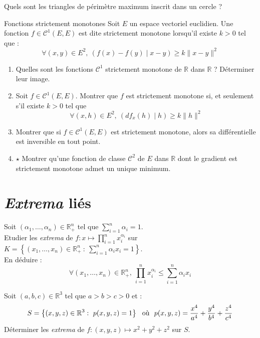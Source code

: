 \documentclass[french,a4paper]{article}
\newcommand{\R}{\mathbb{R}}
\theoremstyle{plain}
\theoremstyle{definition}
\theoremstyle{remark}
\begin{document}
\begin{ex}[Moulin.CD.42]{}
	Quels sont les triangles de périmètre maximum inscrit dans un cercle ?
\end{ex}

\begin{ex}[Moulin.CD.42]{Fonctions strictement monotones}
	Soit $E$ un espace vectoriel euclidien. Une fonction $f\in\mathcal{C}^1(E,E)$ est dite strictement monotone lorsqu'il existe $k>0$ tel que : $$\forall (x,y)\in E^2,\ \left(f(x)-f(y)\mid x-y\right)\geqslant k\lVert x-y\rVert^2$$
	\begin{enumerate}
		\item Quelles sont les fonctions $\mathcal{C}^1$ strictement monotone de $\R$ dans $\R$ ? Déterminer leur image.
		\item Soit $f\in\mathcal{C}^1(E,E)$. Montrer que $f$ est strictement monotone si, et seulement s'il existe $k>0$ tel que $$\forall (x,h)\in E^2,\ \left(df_x(h)\mid h\right)\geqslant k\lVert h\rVert^2$$
		\item Montrer que si $f\in\mathcal{C}^1(E,E)$ est strictement monotone, alors sa différentielle est inversible en tout point.
		\item $\star$ Montrer qu'une fonction de classe $\mathcal{C}^2$ de $E$ dans $\R$ dont le gradient est strictement monotone admet un unique minimum.
	\end{enumerate}
\end{ex}

\section{\textit{Extrema} liés}

\begin{ex}[Moulin.CD.44]{}
	Soit $(\alpha_1,\ldots,\alpha_n)\in\R_+^n$ tel que $\displaystyle\sum_{i=1}^{n}\alpha_i=1$. \\
	Etudier les \textit{extrema} de $f:x\mapsto\displaystyle\prod_{i=1}^{n}x_i^{\alpha_i}$ sur $K=\displaystyle\left\{(x_1,\ldots,x_n)\in\R_+^n\ : \ \sum_{i=1}^{n}\alpha_ix_i=1\right\}$. \\
	En déduire : $$\forall (x_1,\ldots,x_n)\in\R_+^n,\ \prod_{i=1}^{n}x_i^{\alpha_i}\leqslant\sum_{i=1}^{n}\alpha_ix_i$$
\end{ex}

\begin{ex}[Moulin.CD.45]{}
	Soit $(a,b,c)\in\R^3$ tel que $a>b>c>0$ et : $$S=\left\{(x,y,z)\in\R^3\\ : \ p(x,y,z)=1\right\}\ \ \text{où}\ \ p(x,y,z)=\frac{x^4}{a^4}+\frac{y^4}{b^4}+\frac{z^4}{c^4}$$ Déterminer les \textit{extrema} de $f:(x,y,z)\mapsto x^2+y^2+z^2$ sur $S$.
\end{ex}
\end{document}

